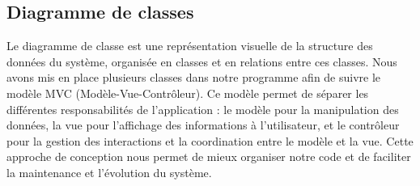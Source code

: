 \subsection{Diagramme de classes}
Le diagramme de classe est une représentation visuelle de la structure des données du système, organisée en classes et en relations entre ces classes. Nous avons mis en place plusieurs classes dans notre programme afin de suivre le modèle MVC (Modèle-Vue-Contrôleur). Ce modèle permet de séparer les différentes responsabilités de l'application : le modèle pour la manipulation des données, la vue pour l'affichage des informations à l'utilisateur, et le contrôleur pour la gestion des interactions et la coordination entre le modèle et la vue. Cette approche de conception nous permet de mieux organiser notre code et de faciliter la maintenance et l'évolution du système.\\ 
